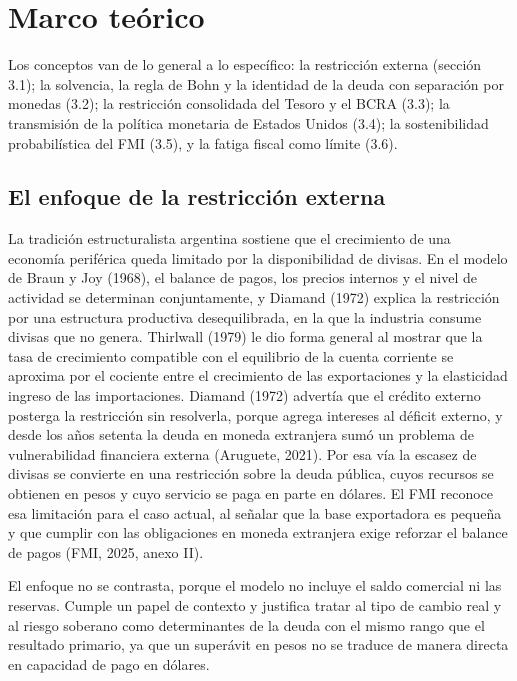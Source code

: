 \chapter{Marco teórico}

Los conceptos van de lo general a lo específico: la restricción externa
(sección 3.1); la solvencia, la regla de Bohn y la identidad de la deuda
con separación por monedas (3.2); la restricción consolidada del Tesoro
y el BCRA (3.3); la transmisión de la política monetaria de Estados
Unidos (3.4); la sostenibilidad probabilística del FMI (3.5), y la
fatiga fiscal como límite (3.6).

\section{El enfoque de la restricción externa}

La tradición estructuralista argentina sostiene que el crecimiento de
una economía periférica queda limitado por la disponibilidad de divisas.
En el modelo de Braun y Joy (1968), el balance de pagos, los precios
internos y el nivel de actividad se determinan conjuntamente, y Diamand
(1972) explica la restricción por una estructura productiva
desequilibrada, en la que la industria consume divisas que no genera.
Thirlwall (1979) le dio forma general al mostrar que la tasa de
crecimiento compatible con el equilibrio de la cuenta corriente se
aproxima por el cociente entre el crecimiento de las exportaciones y la
elasticidad ingreso de las importaciones. Diamand (1972) advertía que el
crédito externo posterga la restricción sin resolverla, porque agrega
intereses al déficit externo, y desde los años setenta la deuda en
moneda extranjera sumó un problema de vulnerabilidad financiera externa
(Aruguete, 2021). Por esa vía la escasez de divisas se convierte en una
restricción sobre la deuda pública, cuyos recursos se obtienen en pesos
y cuyo servicio se paga en parte en dólares. El FMI reconoce esa
limitación para el caso actual, al señalar que la base exportadora es
pequeña y que cumplir con las obligaciones en moneda extranjera exige
reforzar el balance de pagos (FMI, 2025, anexo II).

El enfoque no se contrasta, porque el modelo no incluye el saldo
comercial ni las reservas. Cumple un papel de contexto y justifica
tratar al tipo de cambio real y al riesgo soberano como determinantes de
la deuda con el mismo rango que el resultado primario, ya que un
superávit en pesos no se traduce de manera directa en capacidad de pago
en dólares.

